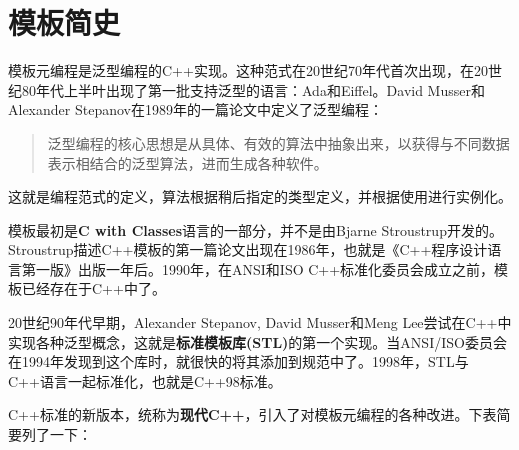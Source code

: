 \section{模板简史}
模板元编程是泛型编程的C++实现。这种范式在20世纪70年代首次出现，在20世纪80年代上半叶出现了第一批支持泛型的语言：Ada和Eiffel。David Musser和Alexander Stepanov在1989年的一篇论文中定义了泛型编程：

\begin{quote}
泛型编程的核心思想是从具体、有效的算法中抽象出来，以获得与不同数据表示相结合的泛型算法，进而生成各种软件。
\end{quote}

这就是编程范式的定义，算法根据稍后指定的类型定义，并根据使用进行实例化。

模板最初是\textbf{C with Classes}语言的一部分，并不是由Bjarne Stroustrup开发的。Stroustrup描述C++模板的第一篇论文出现在1986年，也就是《C++程序设计语言第一版》出版一年后。1990年，在ANSI和ISO C++标准化委员会成立之前，模板已经存在于C++中了。

20世纪90年代早期，Alexander Stepanov, David Musser和Meng Lee尝试在C++中实现各种泛型概念，这就是\textbf{标准模板库(STL)}的第一个实现。当ANSI/ISO委员会在1994年发现到这个库时，就很快的将其添加到规范中了。1998年，STL与C++语言一起标准化，也就是C++98标准。

C++标准的新版本，统称为\textbf{现代C++}，引入了对模板元编程的各种改进。下表简要列了一下：

